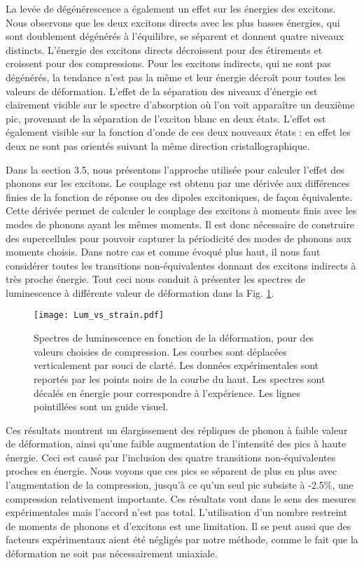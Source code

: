 La levée de dégénérescence a également un effet sur les énergies des excitons. Nous observons que les deux excitons directs avec les plus basses énergies, qui sont doublement dégénérés à l'équilibre, se séparent et donnent quatre niveaux distincts. L'énergie des excitons directs décroissent pour des étirements et croissent pour des compressions. Pour les excitons indirects, qui ne sont pas dégénérés, la tendance n'est pas la même et leur énergie décroît pour toutes les valeurs de déformation. L'effet de la séparation des niveaux d'énergie est clairement visible sur le spectre d'absorption où l'on voit apparaître un deuxième pic, provenant de la séparation de l'exciton blanc en deux états. L'effet est également visible sur la fonction d'onde de ces deux nouveaux états : en effet les deux ne sont pas orientés suivant la même direction cristallographique.

Dans la section 3.5, nous présentons l'approche utilisée pour calculer l'effet des phonons sur les excitons. Le couplage est obtenu par une dérivée aux différences finies de la fonction de réponse ou des dipoles excitoniques, de façon équivalente. Cette dérivée permet de calculer le couplage des excitons à moments finis avec les modes de phonons ayant les mêmes moments. Il est donc nécessaire de construire des supercellules pour pouvoir capturer la périodicité des modes de phonons aux moments choisis. Dans notre cas et comme évoqué plus haut, il nous faut considérer toutes les transitions non-équivalentes donnant des excitons indirects à très proche énergie. Tout ceci nous conduit à présenter les spectres de luminescence à différente valeur de déformation dans la Fig. \ref{fig:Lum_vs_strain_fr}.
\begin{figure}[H]
	\vspace{0.2cm}
	\setcapindent{2em}
	\centering
	\texttt{[image: Lum\_vs\_strain.pdf]}
	\caption{\footnotesize{Spectres de luminescence en fonction de la déformation, pour des valeurs choisies de compression. Les courbes sont déplacées verticalement par souci de clarté. Les données expérimentales sont reportés par les points noirs de la courbe du haut. Les spectres sont décalés en énergie pour correspondre à l'expérience. Les lignes pointillées sont un guide visuel.}}
	\label{fig:Lum_vs_strain_fr}
\end{figure}

Ces résultats montrent un élargissement des répliques de phonon à faible valeur de déformation, ainsi qu'une faible augmentation de l'intensité des pics à haute énergie. Ceci est causé par l'inclusion des quatre transitions non-équivalentes proches en énergie. Nous voyons que ces pics se séparent de plus en plus avec l'augmentation de la compression, jusqu'à ce qu'un seul pic subsiste à -2.5\%, une compression relativement importante. Ces résultats vont dans le sens des mesures expérimentales mais l'accord n'est pas total. L'utilisation d'un nombre restreint de moments de phonons et d'excitons est une limitation. Il se peut aussi que des facteurs expérimentaux aient été négligés par notre méthode, comme le fait que la déformation ne soit pas nécessairement uniaxiale.\\


